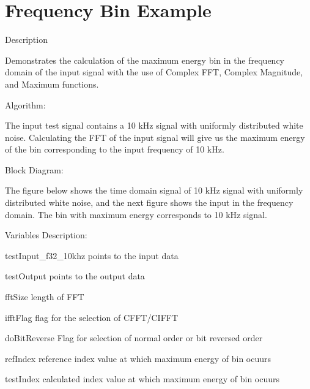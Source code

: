 \hypertarget{group___frequency_bin}{\section{Frequency Bin Example}
\label{group___frequency_bin}
}
\begin{DoxyParagraph}{Description}

\end{DoxyParagraph}
\begin{DoxyParagraph}{}
Demonstrates the calculation of the maximum energy bin in the frequency domain of the input signal with the use of Complex F\-F\-T, Complex Magnitude, and Maximum functions.
\end{DoxyParagraph}
\begin{DoxyParagraph}{Algorithm\-:}

\end{DoxyParagraph}
\begin{DoxyParagraph}{}
The input test signal contains a 10 k\-Hz signal with uniformly distributed white noise. Calculating the F\-F\-T of the input signal will give us the maximum energy of the bin corresponding to the input frequency of 10 k\-Hz.
\end{DoxyParagraph}
\begin{DoxyParagraph}{Block Diagram\-:}

\end{DoxyParagraph}
\begin{DoxyParagraph}{}
The figure below shows the time domain signal of 10 k\-Hz signal with uniformly distributed white noise, and the next figure shows the input in the frequency domain. The bin with maximum energy corresponds to 10 k\-Hz signal. 
\end{DoxyParagraph}
\begin{DoxyParagraph}{}
  
\end{DoxyParagraph}
\begin{DoxyParagraph}{Variables Description\-:}

\end{DoxyParagraph}
\begin{DoxyParagraph}{}
\begin{DoxyItemize}
\item {\ttfamily test\-Input\-\_\-f32\-\_\-10khz} points to the input data \item {\ttfamily test\-Output} points to the output data \item {\ttfamily fft\-Size} length of F\-F\-T \item {\ttfamily ifft\-Flag} flag for the selection of C\-F\-F\-T/\-C\-I\-F\-F\-T \item {\ttfamily do\-Bit\-Reverse} Flag for selection of normal order or bit reversed order \item {\ttfamily ref\-Index} reference index value at which maximum energy of bin ocuurs \item {\ttfamily test\-Index} calculated index value at which maximum energy of bin ocuurs\end{DoxyItemize}

\end{DoxyParagraph}
